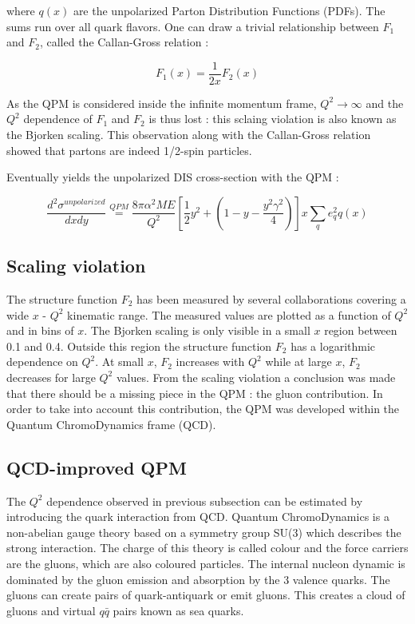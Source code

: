 where $q(x)$ are the unpolarized Parton Distribution Functions (PDFs). The sums run over all quark flavors.
One can draw a trivial relationship between $F_1$ and $F_2$, called the Callan-Gross relation :

\begin{equation}
  F_1(x)=\frac{1}{2x}F_2(x)
\end{equation}

As the QPM is considered inside the infinite momentum frame, $Q^2 \rightarrow \infty$ and the $Q^2$ dependence of
$F_1$ and $F_2$ is thus lost : this sclaing violation is also known as the Bjorken scaling. This observation along
with the Callan-Gross relation showed that partons are indeed 1/2-spin particles.

Eventually yields the unpolarized DIS cross-section with the QPM :

\begin{equation}
  \frac{d^2\sigma^{unpolarized}}{dxdy} \stackrel{QPM}{=} \frac{8\pi\alpha^2ME}{Q^2}[\frac{1}{2}y^2+(1-y-\frac{y^2\gamma^2}{4})]x\sum\limits_{q}e^2_qq(x)
\end{equation}

\subsection*{Scaling violation}

The structure function $F_2$ has been measured by several collaborations covering a wide $x$ - $Q^2$ kinematic range.
The measured values are plotted as a function of $Q^2$ and in bins of $x$. The Bjorken scaling is only visible in a
small $x$ region between 0.1 and 0.4. Outside this region the structure function $F_2$ has a logarithmic dependence on
$Q^2$. At small $x$, $F_2$ increases with $Q^2$ while at large $x$, $F_2$ decreases for large $Q^2$ values. From the scaling
violation a conclusion was made that there should be a missing piece in the QPM : the gluon contribution. In order to take
into account this contribution, the QPM was developed within the Quantum ChromoDynamics frame (QCD).


\subsection*{QCD-improved QPM}

The $Q^2$ dependence observed in previous subsection can be estimated by introducing the quark interaction from QCD.
Quantum ChromoDynamics is a non-abelian gauge theory based on a symmetry group SU(3) which describes the strong interaction.
The charge of this theory is called colour and the force carriers are the gluons, which are also coloured particles. The
internal nucleon dynamic is dominated by the gluon emission and absorption by the 3 valence quarks. The gluons can create
pairs of quark-antiquark or emit gluons. This creates a cloud of gluons and virtual $q\bar{q}$ pairs known as sea quarks.

